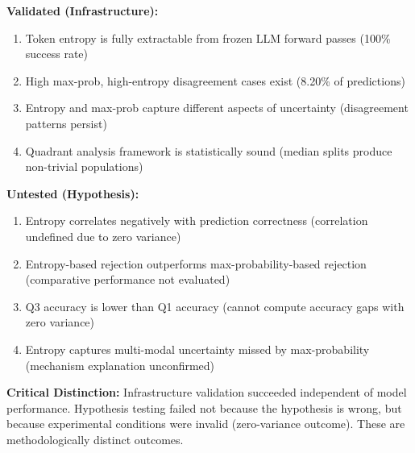 \textbf{Validated (Infrastructure):}
\begin{enumerate}
\item Token entropy is fully extractable from frozen LLM forward passes (100\% success rate)
\item High max-prob, high-entropy disagreement cases exist (8.20\% of predictions)
\item Entropy and max-prob capture different aspects of uncertainty (disagreement patterns persist)
\item Quadrant analysis framework is statistically sound (median splits produce non-trivial populations)
\end{enumerate}

\textbf{Untested (Hypothesis):}
\begin{enumerate}
\item Entropy correlates negatively with prediction correctness (correlation undefined due to zero variance)
\item Entropy-based rejection outperforms max-probability-based rejection (comparative performance not evaluated)
\item Q3 accuracy is lower than Q1 accuracy (cannot compute accuracy gaps with zero variance)
\item Entropy captures multi-modal uncertainty missed by max-probability (mechanism explanation unconfirmed)
\end{enumerate}

\textbf{Critical Distinction:} Infrastructure validation succeeded independent of model performance. Hypothesis testing failed not because the hypothesis is wrong, but because experimental conditions were invalid (zero-variance outcome). These are methodologically distinct outcomes.

